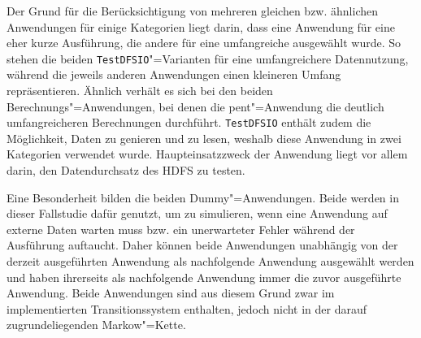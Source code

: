Der Grund für die Berücksichtigung von mehreren gleichen bzw. ähnlichen Anwendungen für einige Kategorien liegt darin, dass eine Anwendung für eine eher kurze Ausführung, die andere für eine umfangreiche ausgewählt wurde. So stehen die beiden \texttt{TestDFSIO}"=Varianten für eine umfangreichere Datennutzung, während die jeweils anderen Anwendungen einen kleineren Umfang repräsentieren. Ähnlich verhält es sich bei den beiden Berechnungs"=Anwendungen, bei denen die \acl{pent}"=Anwendung die deutlich umfangreicheren Berechnungen durchführt. \texttt{TestDFSIO} enthält zudem die Möglichkeit, Daten zu genieren und zu lesen, weshalb diese Anwendung in zwei Kategorien verwendet wurde. Haupteinsatzzweck der Anwendung liegt vor allem darin, den Datendurchsatz des \ac{HDFS} zu testen.

Eine Besonderheit bilden die beiden Dummy"=Anwendungen. Beide werden in dieser Fallstudie dafür genutzt, um zu simulieren, wenn eine Anwendung auf externe Daten warten muss bzw. ein unerwarteter Fehler während der Ausführung auftaucht. Daher können beide Anwendungen unabhängig von der derzeit ausgeführten Anwendung als nachfolgende Anwendung ausgewählt werden und haben ihrerseits als nachfolgende Anwendung immer die zuvor ausgeführte Anwendung. Beide Anwendungen sind aus diesem Grund zwar im implementierten Transitionssystem enthalten, jedoch nicht in der darauf zugrundeliegenden Markow"=Kette.

